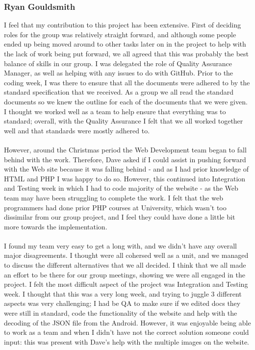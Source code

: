 \documentclass[12pt]{article}
\begin{document}
\subsubsection{Ryan Gouldsmith}
I feel that my contribution to this project has been extensive. First of deciding roles for the group was relatively straight forward, and although some people ended up being moved around to other tasks later on in the project to help with the lack of work being put forward, we all agreed that this was probably the best balance of skills in our group. I was delegated the role of Quality Assurance Manager, as well as helping with any issues to do with GitHub. Prior to the coding week, I was there to ensure that all the documents were adhered to by the standard specification that we received. As a group we all read the standard documents so we knew the outline for each of the documents that we were given. I thought we worked well as a team to help ensure that everything was to standard; overall, with the Quality Assurance I felt that we all worked together well and that standards were mostly adhered to.
~\\\\
However, around the Christmas period the Web Development team began to fall behind with the work. Therefore, Dave asked if I could assist in pushing forward with the Web site because it was falling behind - and as I had prior knowledge of HTML and PHP I was happy to do so. However, this continued into Integration and Testing week in which I had to code majority of the website - as the Web team may have been struggling to complete the work. I felt that the web programmers had done prior PHP courses at University, which wasn't too dissimilar from our group project, and I feel they could have done a little bit more towards the implementation.
~\\\\
I found my team very easy to get a long with, and we didn't have any overall major disagreements. I thought were all cohersed well as a unit, and we managed to discuss the different alternatives that we all decided. I think that we all made an effort to be there for our group meetings, showing we were all engaged in the project. I felt the most difficult aspect of the project was Integration and Testing week. I thought that this was a very long week, and trying to juggle 3 different aspects was very challenging; I had be QA to make sure if we edited docs they were still in standard, code the functionality of the website and help with the decoding of the JSON file from the Android. However, it was enjoyable being able to work as a team and when I didn't have not the correct solution someone could input: this was present with Dave's help with the multiple images on the website. 
\end{document}
